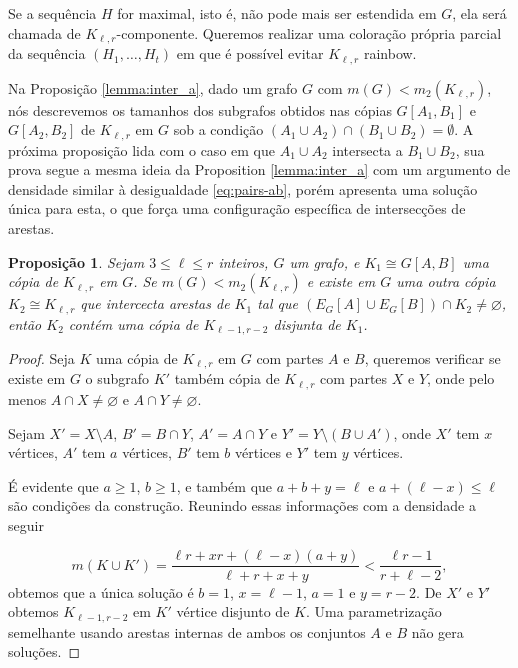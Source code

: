 \documentclass[11pt,twoside,a4paper]{book}
\newcommand{\K}{K_{\ell,r}} %
\newtheorem{proposicao} [teorema] {Proposição}
\theoremstyle{note}
\begin{document}
     Se a sequência $H$ for maximal, isto é, não pode mais ser estendida em $G$, ela será chamada de $\K$-componente.
     Queremos realizar uma coloração própria parcial da sequência $(H_1, \ldots, H_t)$ em que é possível evitar $\K$ rainbow.
 
 Na Proposição \ref{lemma:inter_a}, dado um grafo $G$ com
 $m(G) < m_2(\K)$, nós descrevemos os tamanhos dos subgrafos obtidos nas cópias $G[A_1,B_1]$ e $G[A_2,B_2]$ de $K_{\ell,r}$ em $G$ sob a condição $(A_1\cup A_2)\cap(B_1\cup B_2) = \emptyset$.
 A próxima proposição lida com o caso em que $A_1\cup A_2$ intersecta a $B_1\cup B_2$, sua prova segue a mesma ideia da Proposition \ref{lemma:inter_a} com um argumento de densidade similar à desigualdade \ref{eq:pairs-ab}, porém apresenta uma solução única para esta, o que força uma configuração específica de intersecções de arestas.


    \begin{proposicao}\label{aff:casoP1}
       Sejam $3\leq \ell \leq r$ inteiros, 
      $G$ um grafo, e $K_1 \cong G[A, B]$ uma cópia de $\K$ em $G$.
      Se $m(G) < m_2(\K)$ e existe em $G$ uma outra cópia
        $K_2 \cong \K $ que intercecta arestas de $K_1$ tal que 
        $(E_G[A] \cup E_G[B]) \cap K_2 \neq \varnothing$, 
        então $K_2$ contém uma cópia de $K_{\ell-1,r-2}$ disjunta de $K_1$.
    \end{proposicao}
     \begin{proof}
         Seja $K$ uma cópia de $\K$ em $G$ com partes $A$ e $B$, queremos verificar se existe em $G$ o subgrafo $K'$ também cópia de $\K$ com partes $X$ e $Y$, onde pelo menos $A \cap X \neq \varnothing$ e $A \cap Y \neq \varnothing$.
         
         Sejam $X' = X\setminus A$,  $B' = B\cap Y$, $A' = A \cap Y$ e $Y' = Y \setminus (B\cup A')$, 
         onde
         $X'$ tem $x$ vértices, $A'$ tem $a$ vértices, $B'$ tem $b$ vértices e $Y'$ tem $y$ vértices.
         
         É evidente que $a \geq 1$, $b \geq 1$, e também que $a + b+y = \ell$ e $a + (\ell-x) \leq \ell$ são condições da construção. 
         Reunindo essas informações com a densidade a seguir 
         
         \[
            m(K \cup K') = \frac{\ell r + xr + (\ell-x)(a+y)}{\ell+r+x+y}
            < \frac{\ell r - 1}{r+\ell-2},
         \]
         obtemos que a única solução é $b=1$, $x = \ell-1$, $a=1$ e $y=r-2$. 
         De $X'$ e $Y'$ obtemos $K_{\ell-1, r-2}$ em $K'$ vértice disjunto de $K$.
         Uma parametrização semelhante usando arestas internas de ambos os conjuntos $A$ e $B$ não gera soluções.       
     \end{proof}
     
\end{document}
